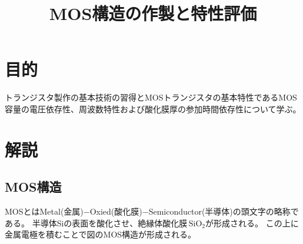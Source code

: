 \documentclass[11pt]{jarticle}
\title{MOS構造の作製と特性評価}
\begin{document}
\maketitle

\section{目的}
	トランジスタ製作の基本技術の習得とMOSトランジスタの基本特性であるMOS容量の電圧依存性、周波数特性および酸化膜厚の参加時間依存性について学ぶ。

\section{解説}
	\subsection{MOS構造}
		MOSとはMetal(金属)−Oxied(酸化膜)−Semiconductor(半導体)の頭文字の略称である。
		半導体Siの表面を酸化させ、絶縁体酸化膜\,$\mathrm{SiO_{2}}$が形成される。
		この上に金属電極を積むことで図のMOS構造が形成される。
\end{document}

